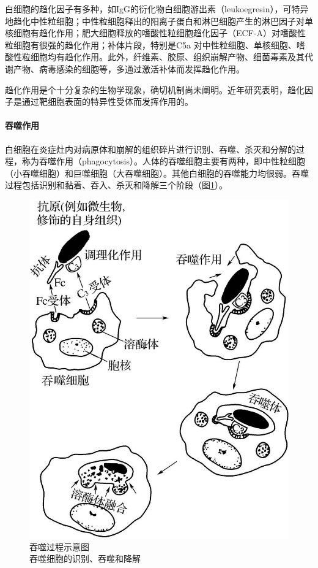 白细胞的趋化因子有多种，如IgG的衍化物白细胞游出素（leukoegresin），可特异地趋化中性粒细胞；中性粒细胞释出的阳离子蛋白和淋巴细胞产生的淋巴因子对单核细胞有趋化作用；肥大细胞释放的嗜酸性粒细胞趋化因子（ECF-A）对嗜酸性粒细胞有很强的趋化作用；补体片段，特别是C{5a}
对中性粒细胞、单核细胞、嗜酸性粒细胞均有趋化作用。此外，纤维素、胶原、组织崩解产物、细菌毒素及其代谢产物、病毒感染的细胞等，多通过激活补体而发挥趋化作用。

趋化作用是个十分复杂的生物学现象，确切机制尚未阐明。近年研究表明，趋化因子是通过靶细胞表面的特异性受体而发挥作用的。

\paragraph{吞噬作用}
白细胞在炎症灶内对病原体和崩解的组织碎片进行识别、吞噬、杀灭和分解的过程，称为吞噬作用（phagocytosis）。人体的吞噬细胞主要有两种，即中性粒细胞（小吞噬细胞）和巨噬细胞（大吞噬细胞）。其他白细胞的吞噬能力均很弱。吞噬过程包括识别和黏着、吞入、杀灭和降解三个阶段（图\ref{fig4-3}）。

\begin{figure}[!htbp]
  \centering
  \includegraphics[scale=1.2]{./images/Image00053.jpg}
  \caption{吞噬过程示意图 \\ {\small 吞噬细胞的识别、吞噬和降解}}
  \label{fig4-3}
\end{figure}



